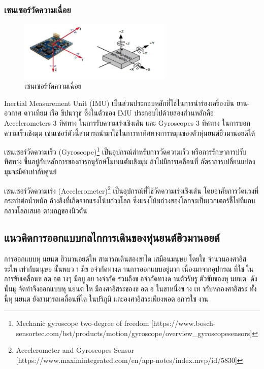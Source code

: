 \clearpage
\subsubsection{เซนเซอร์วัดความเฉื่อย}
\begin{figure}[ht]
    \centering
    \includegraphics[width=0.65\textwidth]{chapter2/images/imu.png}
    \caption{เซนเซอร์วัดความเฉื่อย}
    \label{fig:imu_sensor}
\end{figure}

Inertial Measurement Unit (IMU) เป็นส่วนประกอบหลักที่ใช่ในการนำร่องเครื่องบิน ยาน-อวกาศ ดาวเทียม เรือ
ขีปนาวุธ ซึ่งในตัวของ IMU ประกอบไปด้วยสองส่วนหลักคือ Accelerometers 3 ทิศทาง ในการรับความเร่งเชิงเส้น
และ Gyroscopes 3 ทิศทาง ในการบอกความเร็วเชิงมุม เซนเซอร์ตัวนี้สามารถนำมาใช้ในการหาทิศทางการหมุนของตัวหุ่นยนต์ฮิวมานอยด์ได้

เซนเซอร์วัดความเร็ว (Gyroscope)\footnote{ Mechanic gyroscope two-degree of freedom [https://www.bosch-sensortec.com/bst/products/motion/gyroscope/overview\_gyroscopesensors] }
เป็นอุปกรณ์สำหรับการวัดความเร็ว หรือการรักษาการปรับทิศทาง ขึ้นอยู่กับหลักการของการอนุรักษ์โมเมนตัมเชิงมุม
ถ้าไม่มีการเคลื่อนที่ อัตราการเปลี่ยนแปลงมุมจะมีค่าเท่ากับศูนย์

เซนเซอร์วัดความเร่ง (Accelerometer)\footnote{ Accelerometer and Gyroscopes Sensor [https://www.maximintegrated.com/en/app-notes/index.mvp/id/5830] }
เป็นอุปกรณ์ที่ใช้วัดความเร่งเชิงเส้น โดยอาศัยการวัดแรงที่กระทำต่อน้ำหนัก
อ้างอิงที่เกิดจากแรงโน้มถ่วงโลก ซึ่งแรงโน้มถ่วงของโลกจะเป็นเวกเตอร์ชี้ไปที่แกนกลางโลกเสมอ ตามกฎของนิวตัน

\subsection{แนวคิดการออกแบบกลไกการเดินของหุ่นยนต์ฮิวมานอยด์}
การออกแบบหุนยนตฮิวมานอยด์ใหสามารถเดินสองขาไดเสมือนมนุษยโดยใชจํานวนองศาอิสระใหเท่ากับมนุษยนั้นพบวา
มีขอจํากัดทางดานการออกแบบอยู่มาก เนื่องมาจากอุปกรณที่ใชในการขับเคลื่อนขอตอตางๆ มีอยูอยางจํากัด
รวมถึงขอจํากัดทางดานตัวรับรูตัวขับของหุนยนต ดังนั้นผูจัดทําจึงออกแบบหุนยนตใหมีองศาอิสระของขอตอ ในขาหนึ่งขาง
เทากับหกองศาอิสระ ทั้งนี้หุนยนตยังสามารถเคลื่อนที่ไดในปริภูมิ และองศาอิสระเพียงพอตอการใชงาน